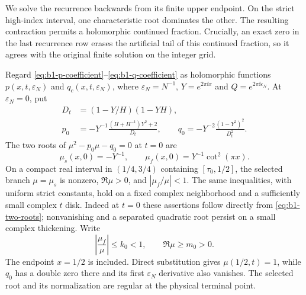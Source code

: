 We solve the recurrence backwards from its finite upper endpoint. On the strict high-index interval, one characteristic root dominates the other. The resulting contraction permits a holomorphic continued fraction. Crucially, an exact zero in the last recurrence row erases the artificial tail of this continued fraction, so it agrees with the original finite solution on the integer grid.

Regard \eqref{eq:b1-p-coefficient}--\eqref{eq:b1-q-coefficient} as
holomorphic functions $p(x,t,\varepsilon_N)$ and
$q_c(x,t,\varepsilon_N)$, where
$\varepsilon_N=N^{-1}$, $Y=e^{2\pi\ii x}$ and
$Q=e^{2\pi\ii\varepsilon_N}$. At $\varepsilon_N=0$, put
\begin{equation}\label{eq:b1-leading-recurrence}
 \begin{split}
 D_t&=(1-Y/H)(1-YH),\\
 p_0&=-Y^{-1}\frac{(H+H^{-1})Y^2+2}{D_t},\qquad
 q_0=-Y^{-2}\frac{(1-Y^2)^2}{D_t^2}.
 \end{split}
\end{equation}
The two roots of $\mu^2-p_0\mu-q_0=0$ at $t=0$ are
\begin{equation}\label{eq:b1-two-roots}
 \mu_s(x,0)=-Y^{-1},\qquad
 \mu_f(x,0)=Y^{-1}\cot^2(\pi x).
\end{equation}
On a compact real interval in $(1/4,3/4)$ containing
$[\tau_0,1/2]$, the selected branch $\mu=\mu_s$ is nonzero,
$\Re\mu>0$, and $|\mu_f/\mu|<1$. The same inequalities, with uniform
strict constants, hold on a fixed complex neighborhood and a sufficiently
small complex $t$ disk. Indeed at $t=0$ these assertions follow directly
from \eqref{eq:b1-two-roots}; nonvanishing and a separated quadratic root
persist on a small complex thickening. Write
\begin{equation}\label{eq:b1-dominance}
 \left|\frac{\mu_f}{\mu}\right|\le k_0<1,
 \qquad \Re\mu\ge m_0>0.
\end{equation}
The endpoint $x=1/2$ is included. Direct substitution gives
$\mu(1/2,t)=1$, while $q_0$ has a double zero there and its first
$\varepsilon_N$ derivative also vanishes. The selected root and its
normalization are regular at the physical terminal point.


